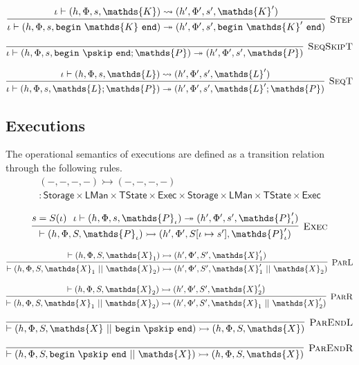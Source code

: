 \[
\infer[\textsc{Step}]
{
	\iota \vdash (h, \Phi, s, \mathtt{begin}\ \mathds{K}\ \mathtt{end})
	\twoheadrightarrow
	(h', \Phi', s', \mathtt{begin}\ \mathds{K}'\ \mathtt{end})
}
{
	\iota \vdash (h, \Phi, s, \mathds{K})
	\rightsquigarrow
	(h', \Phi', s', \mathds{K}')
}
\]

\[
\infer[\textsc{SeqSkipT}]
{
	\iota \vdash (h, \Phi, s, \mathtt{begin}\ \pskip\ \mathtt{end}; \mathds{P})
	\twoheadrightarrow
	(h', \Phi', s', \mathds{P})
}
{}
\]

\[
\infer[\textsc{SeqT}]
{
	\iota \vdash (h, \Phi, s, \mathds{L}; \mathds{P})
	\twoheadrightarrow
	(h', \Phi', s', \mathds{L}'; \mathds{P})
}
{
	\iota \vdash (h, \Phi, s, \mathds{L})
	\rightsquigarrow
	(h', \Phi', s', \mathds{L}')
}
\]

\subsection{Executions}

The operational semantics of executions are defined as a transition relation through the following rules.
\begin{gather*}
(-, -, -, -) \rightarrowtail (-, -, -, -) \\
: \mathsf{Storage} \times \mathsf{LMan} \times \mathsf{TState} \times \mathsf{Exec} \times \mathsf{Storage} \times \mathsf{LMan} \times \mathsf{TState} \times \mathsf{Exec}
\end{gather*}

\[
\infer[\textsc{Exec}]
{
	\vdash (h, \Phi, S, \mathds{P}_\iota)
	\rightarrowtail
	(h', \Phi', S[\iota \mapsto s'], \mathds{P}_\iota')
}
{
	s = S(\iota)\ \
	\iota \vdash (h, \Phi, s, \mathds{P}_\iota)
	\twoheadrightarrow
	(h', \Phi', s', \mathds{P}_\iota')
}
\]

\[
\infer[\textsc{ParL}]
{
	\vdash (h, \Phi, S, \mathds{X}_1\ ||\ \mathds{X}_2)
	\rightarrowtail
	(h', \Phi', S', \mathds{X}_1'\ ||\ \mathds{X}_2)
}
{
	\vdash (h, \Phi, S, \mathds{X}_1)
	\rightarrowtail
	(h', \Phi', S', \mathds{X}_1')
}
\]

\[
\infer[\textsc{ParR}]
{
	\vdash (h, \Phi, S, \mathds{X}_1\ ||\ \mathds{X}_2)
	\rightarrowtail
	(h', \Phi', S', \mathds{X}_1\ ||\ \mathds{X}_2')
}
{
	\vdash (h, \Phi, S, \mathds{X}_2)
	\rightarrowtail
	(h', \Phi', S', \mathds{X}_2')
}
\]

\[
\infer[\textsc{ParEndL}]
{
	\vdash (h, \Phi, S, \mathds{X}\ ||\ \mathtt{begin}\ \pskip\ \mathtt{end})
	\rightarrowtail
	(h, \Phi, S, \mathds{X})
}
{}
\]

\[
\infer[\textsc{ParEndR}]
{
	\vdash (h, \Phi, S, \mathtt{begin}\ \pskip\ \mathtt{end}\ ||\ \mathds{X})
	\rightarrowtail
	(h, \Phi, S, \mathds{X})
}
{}
\]